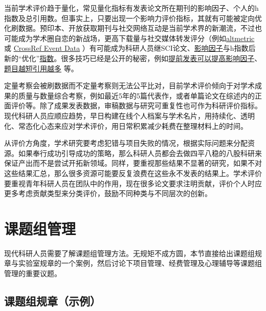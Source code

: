 \documentclass[]{tufte-book}
\begin{document}
当前学术评价趋于量化，常见量化指标有发表论文所在期刊的影响因子、个人的h指数及总引用数。但事实上，只要出现一个影响力评价指标，其就有可能被定向优化刷数据。预印本、开放获取期刊与社交网络互动是当前学术界的新潮流，不过也可能成为学术圈自恋的新战场，更高下载量与社交媒体转发评分（例如\href{https://www.altmetric.com/}{altmetric} 或 \href{https://www.crossref.org/education/event-data/}{CrossRef Event Data} ）有可能成为科研人员继SCI论文、\href{https://onlinelibrary.wiley.com/doi/full/10.1111/eci.13151}{影响因子}与h指数后新的``优化''\href{https://liorpachter.wordpress.com/2019/01/29/technologies-of-narcissism/}{指数}。很多技巧已经是公开的秘密，例如\href{http://journals.plos.org/plosone/article?id=10.1371/journal.pone.0053374}{提前发表可以提高影响因子}、\href{http://rsos.royalsocietypublishing.org/content/2/8/150266}{题目越短引用越多} 等。

定量考察会被刷数据而不定量考察则无法公平比对，目前学术评价倾向于对学术成果的质量与数量综合考察，例如最近5年的5篇代表作，或者单篇论文在综述内的正面评价等。除了成果发表数据，审稿数据与研究可重复性也可作为科研评价指标。现代科研人员应顺应趋势，早日构建在线个人档案与学术名片，用持续化、透明化、常态化心态来应对学术评价，用日常积累减少耗费在整理材料上的时间。

从评价方角度，学术研究要考虑犯错与项目失败的情况，根据实际问题来分配资源。如果奉行成功引导成功的策略，那么科研人员都会去做四平八稳的八股科研来保证产出而不是尝试开拓新领域。同样，要重视那些结果不显著的研究，如果不对这些结果汇总，那么很多资源可能要反复浪费在这些永不发表的结果上。学术评价要重视青年科研人员在团队中的作用，现在很多论文要求注明贡献，评价个人时应更多考虑贡献类型来分类评价，鼓励不同种类与不同层次的创新。

\hypertarget{ux8bfeux9898ux7ec4ux7ba1ux7406}{%
\section{课题组管理}\label{ux8bfeux9898ux7ec4ux7ba1ux7406}}

现代科研人员需要了解课题组管理方法。无规矩不成方圆，本节直接给出课题组规章与实验室规章的一个案例，然后讨论下项目管理、经费管理及心理辅导等课题组管理的重要议题。

\hypertarget{ux8bfeux9898ux7ec4ux89c4ux7ae0ux793aux4f8b}{%
\subsection{课题组规章（示例）}\label{ux8bfeux9898ux7ec4ux89c4ux7ae0ux793aux4f8b}}
\end{document}
